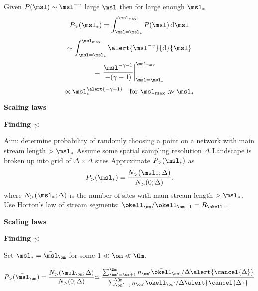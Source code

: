 \begin{frame}[label=]
\begin{frame}[label=]
\begin{frame}[label=]
\begin{frame}[label=]
\begin{frame}[label=]
\begin{frame}[label=]
\begin{frame}[label=]
\begin{frame}[label=]
\begin{frame}[label=]
\begin{frame}[label=]
\begin{frame}[label=]
\begin{frame}[label=]
\begin{frame}[label=]
\begin{frame}[label=]
\begin{frame}[label=]
\begin{frame}[label=]
\begin{frame}[label=]
\begin{frame}[label=]
\begin{frame}[label=]
\begin{frame}[label=]
\begin{frame}[label=]
\begin{frame}[label=]
\begin{frame}[label=]
\begin{frame}[label=]
\begin{frame}[label=]
\begin{frame}[label=]
        Given $P(\msl) \sim \msl^{-\gamma}$ large $\msl$ then
        for large enough $\msl_\ast$
        $$ 
        P_> (\msl_\ast) = 
        \int_{\msl=\msl_{\ast}}^{\msl_{\max}} P(\msl)\, {\textnormal{d}}{\msl}
        $$
        {
          $$
          \sim
          \int_{\msl=\msl_{\ast}}^{\msl_{\max}} \alert{\msl^{-\gamma}} {\textnormal{d}}{\msl}
          $$
        }
        {
          $$
          = 
          \left.
            \frac{\msl^{-\gamma+1}}
            {-(\gamma-1)}
          \right|_{\msl=\msl_{\ast}}^{\msl_{\max}}
          $$
        }
        {
          $$
          \propto
          \msl_\ast^{\alert{-\gamma+1}}
          \mbox{\quad for $ \msl_{\max} \gg \msl_\ast$}
          $$
        }
    
  


\begin{frame}[label=]
  \textbf{Scaling laws}

  \textbf{Finding $\gamma$:}
    
     \alert{Aim:} determine probability of randomly choosing
      a point on a network with main stream length $> \msl_\ast$
     Assume some spatial sampling resolution $\Delta$
     Landscape is broken up into grid of $\Delta \times \Delta$ sites
     Approximate $P_> (\msl_\ast)$ as 
      $$
      P_> (\msl_\ast)
      =
      \frac
      {N_> (\msl_\ast; \Delta)}
      {N_> (0; \Delta)}.
      $$
      where $N_> (\msl_\ast; \Delta)$ is the number of sites
      with main stream length $> \msl_\ast$.
     Use Horton's law of stream segments: $\bar{\okell}_\om/\bar{\okell}_{\om-1} = R_\okell$...
    
  


\begin{frame}[label=]
  \textbf{Scaling laws}

  \textbf{Finding $\gamma$:}
    
     Set $\msl_\ast = \bar{\msl}_\om$ for some $1 \ll \om \ll \Om$.
    
      $$
      P_> (\bar{\msl}_\om)
      =
      \frac
      {N_> (\bar{\msl}_\om; \Delta)}
      {N_> (0; \Delta)}
      {
        \simeq
        \frac
        {
          \sum_{\om'=\om+1}^{\Om} n_{\om'}
          \bar{\okell}_{\om'}/{\Delta}{\alert{\cancel{\Delta}}}
        }
        {
          \sum_{\om'=1}^{\Om} n_{\om'} \bar{\okell}_{\om'}/{\Delta}{\alert{\cancel{\Delta}}}
        }
      }
      $$
    

\end{frame}
\end{frame}
\end{frame}
\end{frame}
\end{frame}
\end{frame}
\end{frame}
\end{frame}
\end{frame}
\end{frame}
\end{frame}
\end{frame}
\end{frame}
\end{frame}
\end{frame}
\end{frame}
\end{frame}
\end{frame}
\end{frame}
\end{frame}
\end{frame}
\end{frame}
\end{frame}
\end{frame}
\end{frame}
\end{frame}
\end{frame}
\end{frame}
